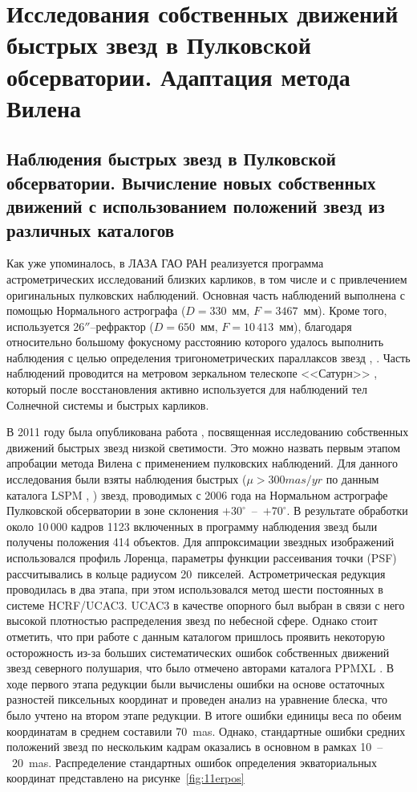 \chapter{Исследования собственных движений быстрых звезд в Пулковcкой обсерватории. Адаптация метода Вилена} \label{ch:ch3}
\section{Наблюдения быстрых звезд в Пулковской обсерватории. Вычисление новых собственных движений с использованием положений звезд из различных каталогов} \label{sec:ch3/sect1}
Как уже упоминалось, в ЛАЗА ГАО РАН  реализуется программа астрометрических исследований близких карликов, в том числе и с привлечением оригинальных пулковских наблюдений. Основная часть наблюдений выполнена с помощью Нормального астрографа ($D=330$~мм, $F=3467$~мм).  Кроме того, используется  26$''$--рефрактор ($D=650$~мм, $F=10\,413$~мм), благодаря относительно большому фокусному расстоянию которого удалось выполнить наблюдения с целью определения тригонометрических параллаксов звезд \cite{2010AstL...36..576K}, \cite{2013MNRAS.435.1083K}. Часть наблюдений проводится на метровом зеркальном телескопе <<Сатурн>> \cite{2015arXiv151101642K}, который после восстановления активно используется для наблюдений тел Солнечной системы и быстрых карликов.

В 2011 году была опубликована работа \cite{2011AstL...37..420K}, посвященная исследованию собственных движений быстрых звезд низкой светимости. Это можно назвать первым этапом апробации метода Вилена с применением пулковских наблюдений. Для данного исследования были взяты наблюдения быстрых ($\mu>300 mas/yr$ по данным каталога LSPM \cite{2005AJ....129.1483L}, \cite{2008IAUS..248...74L}) звезд, проводимых с 2006 года на Нормальном астрографе Пулковской обсерватории в зоне склонения $+30^{\circ}$~--~$+70^{\circ}$. В результате обработки около 10\,000 кадров 1123 включенных в программу наблюдения звезд были получены положения 414 объектов. Для аппроксимации звездных изображений использовался профиль Лоренца, параметры функции рассеивания точки (PSF) рассчитывались в кольце радиусом 20~пикселей. Астрометрическая редукция проводилась в два этапа, при этом использовался метод шести постоянных в системе  HCRF/UCAC3. UCAC3 \cite{2010AJ....139.2184Z} в качестве опорного был выбран в связи с него высокой плотностью распределения звезд по небесной сфере. Однако стоит отметить, что при работе с данным каталогом пришлось проявить некоторую осторожность из-за больших систематических ошибок собственных движений звезд северного полушария, что было отмечено авторами  каталога PPMXL \cite{2010AJ....139.2440R}. В ходе первого этапа редукции были вычислены ошибки на основе остаточных разностей пиксельных координат и проведен анализ на уравнение блеска, что было учтено на втором этапе редукции. В итоге ошибки единицы веса по обеим координатам в среднем составили 70~mas. Однако, стандартные ошибки средних положений звезд по нескольким кадрам оказались в основном в рамках 10~--~20~mas. Распределение стандартных ошибок определения экваториальных координат представлено на рисунке~\ref{fig:11erpos}

